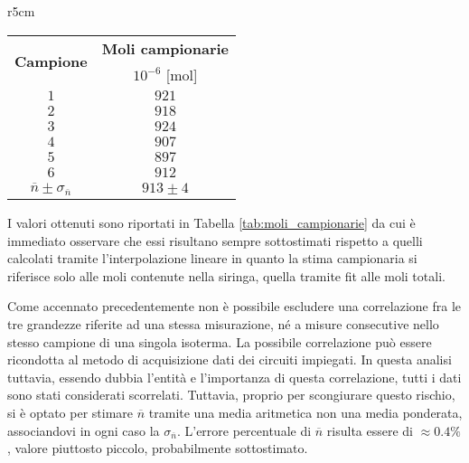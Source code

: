 \documentclass[a4paper,11pt,oneside]{article}
\begin{document}
\begin{wraptable}{r}{5cm}
    \begin{tabular}{|c|c|}
        \hline
        \multirow{2}{*}{\textbf{Campione}} & \textbf{Moli campionarie}\\
        & $10^{-6}$ [mol] \\ \hline
        \rowcolor[rgb]{0.85,0.85,0.85}$1$ & $921$ \\ \hline
        $2$ & $918$ \\ \hline
        \rowcolor[rgb]{0.85,0.85,0.85}$3$ & $924$ \\ \hline
        $4$ & $907$ \\ \hline
        \rowcolor[rgb]{0.85,0.85,0.85}$5$ & $897$ \\ \hline
        $6$ & $912$ \\ \hline\hline
        \rowcolor[rgb]{0.85,0.85,0.85}$\overline{n}\pm\sigma_{\overline{n}}$ & $913 \pm 4$ \\ \hline
    \end{tabular}
    \caption{Moli Campionarie}
    \label{tab:moli_campionarie}
\end{wraptable}

I valori ottenuti sono riportati in Tabella \ref{tab:moli_campionarie} da cui è immediato osservare che essi risultano sempre sottostimati rispetto a quelli calcolati tramite l'interpolazione lineare in quanto la stima campionaria si riferisce solo alle moli contenute nella siringa, quella tramite fit alle moli totali.

Come accennato precedentemente non è possibile escludere una correlazione fra le tre grandezze riferite ad una stessa misurazione, né a misure consecutive nello stesso campione di una singola isoterma. La possibile correlazione può essere ricondotta al metodo di acquisizione dati dei circuiti impiegati. In questa analisi tuttavia, essendo dubbia l'entità e l'importanza di questa correlazione, tutti i dati sono stati considerati scorrelati. Tuttavia, proprio per scongiurare questo rischio, si è optato per stimare $\overline{n}$ tramite una media aritmetica non una media ponderata, associandovi in ogni caso la $\sigma_{\overline{n}}$. L'errore percentuale di $\overline{n}$ risulta essere di $\approx 0.4 \%$, valore piuttosto piccolo, probabilmente sottostimato. 
\end{document}
